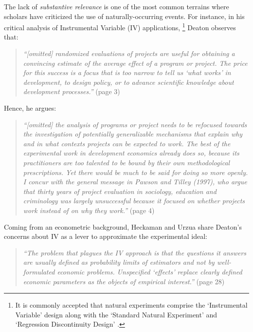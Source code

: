 \begin{refsection}
The lack of \textit{substantive relevance} is one of the most common terrains 
where scholars have criticized the use of naturally-occurring events. For 
instance, in his critical analysis of Instrumental Variable (IV) applications,
\footnote{It is commonly accepted that natural experiments comprise the 
`Instrumental Variable' design along with the `Standard Natural Experiment' 
and `Regression Discontinuity Design' \autocite{sieweke_santoni_2020,dunning_2012}.} 
Deaton \autocite*{deaton_2009} observes that:

\begin{quote}
\textit{
  ``[omitted] randomized evaluations of projects are useful for obtaining a convincing
  estimate of the average effect of a program or project. The price for this
  success is a focus that is too narrow to tell us `what works' in development,
  to design policy, or to advance scientific knowledge about development
  processes.''
  }
  (page 3)
\end{quote}

Hence, he argues:

\begin{quote}
   \textit{
  ``[omitted] the analysis of programs or project needs to be refocused towards
  the investigation of potentially generalizable mechanisms that explain why and
  in what contexts projects can be expected to work. The best of the
  experimental work in development economics already does so, because its
  practitioners are too talented to be bound by their own methodological
  prescriptions. Yet there would be much to be said for doing so more openly. I
  concur with the general message in Pawson and Tilley (1997), who argue that
  thirty years of project evaluation in sociology, education and criminology was
  largely unsuccessful because it focused on whether projects work instead of on
  why they work.''
  }
  (page 4)
\end{quote}

Coming from an econometric background, Heckaman and Urzua
\autocite*{heckman_urzua_2010} share Deaton's concerns about IV as a lever to
approximate the experimental ideal:

\begin{quote}
  \textit{
  ``The problem that plagues the IV approach is that the questions it answers are
  usually defined as probability limits of estimators and not by well-formulated
  economic problems. Unspecified `effects' replace clearly defined economic
  parameters as the objects of empirical interest.''
  }
  (page 28)
\end{quote}


\end{refsection}
